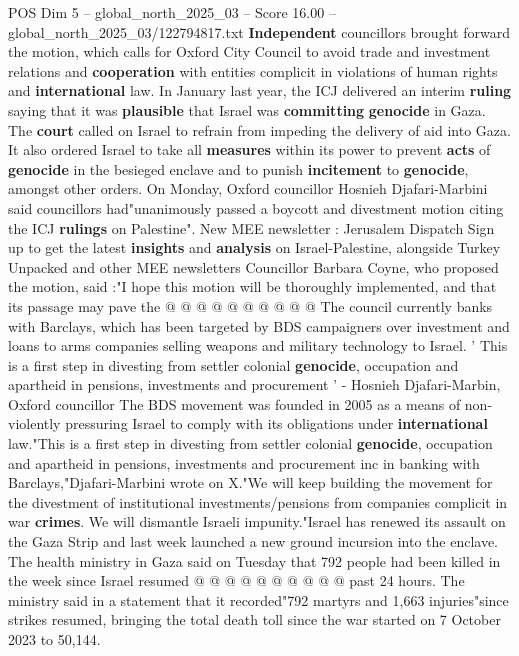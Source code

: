 \begin{textsample}{POS Dim 5 – global\_north\_2025\_03 – Score 16.00 – global\_north\_2025\_03/122794817.txt}  \label{ex:f5_pos_158}
\textbf{Independent} councillors brought forward the motion, which calls for Oxford City Council to avoid trade and investment relations and \textbf{cooperation} with entities complicit in violations of human rights and \textbf{international} law.
In January last year, the ICJ delivered an interim \textbf{ruling} saying that it was \textbf{plausible} that Israel was \textbf{committing} \textbf{genocide} in Gaza.
The \textbf{court} called on Israel to refrain from impeding the delivery of aid into Gaza.
It also ordered Israel to take all \textbf{measures} within its power to prevent \textbf{acts} of \textbf{genocide} in the besieged enclave and to punish \textbf{incitement} to \textbf{genocide}, amongst other orders.
On Monday, Oxford councillor Hosnieh Djafari-Marbini said councillors had"unanimously passed a boycott and divestment motion citing the ICJ \textbf{rulings} on Palestine".
New MEE newsletter : Jerusalem Dispatch Sign up to get the latest \textbf{insights} and \textbf{analysis} on Israel-Palestine, alongside Turkey Unpacked and other MEE newsletters Councillor Barbara Coyne, who proposed the motion, said :"I hope this motion will be thoroughly implemented, and that its passage may pave the @ @ @ @ @ @ @ @ @ @ The council currently banks with Barclays, which has been targeted by BDS campaigners over investment and loans to arms companies selling weapons and military technology to Israel. ' This is a first step in divesting from settler colonial \textbf{genocide}, occupation and apartheid in pensions, investments and procurement ' - Hosnieh Djafari-Marbin, Oxford councillor The BDS movement was founded in 2005 as a means of non-violently pressuring Israel to comply with its obligations under \textbf{international} law."This is a first step in divesting from settler colonial \textbf{genocide}, occupation and apartheid in pensions, investments and procurement inc in banking with Barclays,"Djafari-Marbini wrote on X."We will keep building the movement for the divestment of institutional investments/pensions from companies complicit in war \textbf{crimes}.
We will dismantle Israeli impunity."Israel has renewed its assault on the Gaza Strip and last week launched a new ground incursion into the enclave.
The health ministry in Gaza said on Tuesday that 792 people had been killed in the week since Israel resumed @ @ @ @ @ @ @ @ @ @ past 24 hours.
The ministry said in a statement that it recorded"792 martyrs and 1,663 injuries"since strikes resumed, bringing the total death toll since the war started on 7 October 2023 to 50,144.

\end{textsample}
